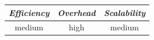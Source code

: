 %
%
%

\begin{center}
\begin{tabular}{ccc}
\emph{Efficiency} & \emph{Overhead} & \emph{Scalability} \\
\hline
%
medium &
high &
medium
\end{tabular}
\end{center}

